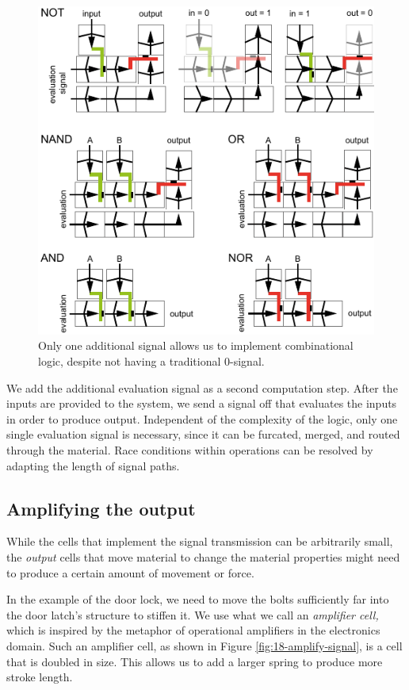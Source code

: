 \begin{figure} [h]  
    \includegraphics[width=\textwidth]{chapters/digital-metamaterials-FIG/17-gates.pdf}
    \caption[Short figure name.]{Only one additional signal allows us to implement combinational logic, despite not having a traditional 0-signal.
    \label{fig:17-gates}}
\end{figure}

We add the additional evaluation signal as a second computation step. After the inputs are provided to the system, we send a signal off that evaluates the inputs in order to produce output. Independent of the complexity of the logic, only one single evaluation signal is necessary, since it can be furcated, merged, and routed through the material. Race conditions within operations can be resolved by adapting the length of signal paths.


\subsection{Amplifying the output}

While the cells that implement the signal transmission can be arbitrarily small, the \textit{output} cells that move material to change the material properties might need to produce a certain amount of movement or force.

In the example of the door lock, we need to move the bolts sufficiently far into the door latch's structure to stiffen it. We use what we call an \textit{amplifier cell,} which is inspired by the metaphor of operational amplifiers in the electronics domain. Such an amplifier cell, as shown in Figure \ref{fig:18-amplify-signal}, is a cell that is doubled in size. This allows us to add a larger spring to produce more stroke length.

